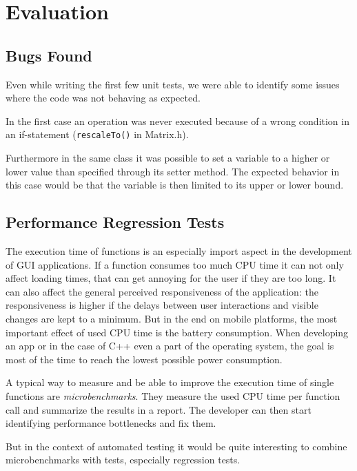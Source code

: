 \documentclass{scrreprt}
\begin{document}

\section{Evaluation}

\subsection{Bugs Found}
Even while writing the first few unit tests, we were able to identify some issues where the code was not behaving as expected.

In the first case an operation was never executed because of a wrong condition in an if-statement (\texttt{rescaleTo()} in Matrix.h).

Furthermore in the same class it was possible to set a variable to a higher or lower value than specified through its setter method. The expected behavior in this case would be that the variable is then limited to its upper or lower bound.

\subsection{Performance Regression Tests}
\label{performance_regression_tests}

The execution time of functions is an especially import aspect in the development of GUI applications. If a function consumes too much CPU time it can not only affect loading times, that can get annoying for the user if they are too long. It can also affect the general perceived responsiveness of the application: the responsiveness is higher if the delays between user interactions and visible changes are kept to a minimum. But in the end on mobile platforms, the most important effect of used CPU time is the battery consumption. When developing an app or in the case of C++ even a part of the operating system, the goal is most of the time to reach the lowest possible power consumption.

A typical way to measure and be able to improve the execution time of single functions are \textit{microbenchmarks}. They measure the used CPU time per function call and summarize the results in a report. The developer can then start identifying performance bottlenecks and fix them.

But in the context of automated testing it would be quite interesting to combine microbenchmarks with tests, especially regression tests.
\end{document}
